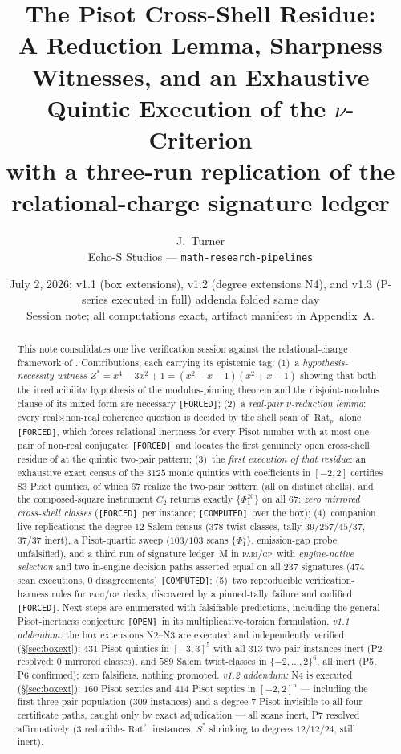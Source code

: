 \documentclass[11pt]{article}
\title{\textbf{The Pisot Cross-Shell Residue:}\\
A Reduction Lemma, Sharpness Witnesses, and an Exhaustive Quintic Execution of the $\nu$-Criterion\\
\large with a three-run replication of the relational-charge signature ledger}
\author{J.~Turner\\ \small Echo-S Studios --- \texttt{math-research-pipelines}}
\date{July 2, 2026; v1.1 (box extensions), v1.2 (degree extensions N4), and v1.3 (P-series executed in full) addenda folded same day \\ \small Session note; all computations exact, artifact manifest in Appendix~A.}
\newcommand{\F}{\textnormal{\texttt{[FORCED]}}}
\newcommand{\C}{\textnormal{\texttt{[COMPUTED]}}}
\newcommand{\Op}{\textnormal{\texttt{[OPEN]}}}
\newcommand{\Rat}{\operatorname{Rat}}
\newcommand{\gp}{\textsc{pari/gp}}
\theoremstyle{definition}
\begin{document}
\maketitle

\begin{abstract}
This note consolidates one live verification session against the relational-charge
framework of \cite{relcharge}. Contributions, each carrying its epistemic tag:
(1)~a \emph{hypothesis-necessity witness} $Z^{*}=x^4-3x^2+1=(x^2-x-1)(x^2+x-1)$
showing that both the irreducibility hypothesis of the modulus-pinning theorem and
the disjoint-modulus clause of its mixed form are necessary \F;
(2)~a \emph{real-pair $\nu$-reduction lemma}: every real$\times$non-real coherence
question is decided by the shell scan of $\Rat_p$ alone \F, which forces relational
inertness for every Pisot number with at most one pair of non-real conjugates \F\
and locates the first genuinely open cross-shell residue of \cite[Cor.~7.16]{relcharge}
at the quintic two-pair pattern;
(3)~the \emph{first execution of that residue}: an exhaustive exact census of the
$3125$ monic quintics with coefficients in $[-2,2]$ certifies $83$ Pisot quintics,
of which $67$ realize the two-pair pattern (all on distinct shells), and the
composed-square instrument $C_2$ returns exactly $\{\Phi_1^{20}\}$ on all $67$:
\emph{zero mirrored cross-shell classes} (\F\ per instance; \C\ over the box);
(4)~companion live replications: the degree-$12$ Salem census
($378$ twist-classes, tally $39/257/45/37$, $37/37$ inert), a Pisot-quartic sweep
($103/103$ scans $\{\Phi_1^4\}$, emission-gap probe unfalsified), and a third run
of signature ledger~M in \gp\ with \emph{engine-native selection} and two
in-engine decision paths asserted equal on all $237$ signatures ($474$ scan
executions, $0$ disagreements) \C;
(5)~two reproducible verification-harness rules for \gp\ decks, discovered by a
pinned-tally failure and codified \F.
Next steps are enumerated with falsifiable predictions, including the general
Pisot-inertness conjecture \Op\ in its multiplicative-torsion formulation.
\emph{v1.1 addendum:} the box extensions N2--N3 are executed and independently
verified (\S\ref{sec:boxext}): $431$ Pisot quintics in $[-3,3]^5$ with all
$313$ two-pair instances inert (P2 resolved: $0$ mirrored classes), and $589$
Salem twist-classes in $\{-2,\dots,2\}^6$, all inert (P5, P6 confirmed); zero
falsifiers, nothing promoted. \emph{v1.2 addendum:} N4 is executed
(\S\ref{sec:boxext}): $160$ Pisot sextics and $414$ Pisot septics in
$[-2,2]^n$ --- including the first three-pair population ($309$ instances)
and a degree-$7$ Pisot invisible to all four certificate paths, caught only
by exact adjudication --- all scans inert, P7 resolved affirmatively
($3$ reducible-$\Rat^{\circ}$ instances, $S^{*}$ shrinking to degrees
$12/12/24$, still inert).
\end{abstract}
\end{document}
